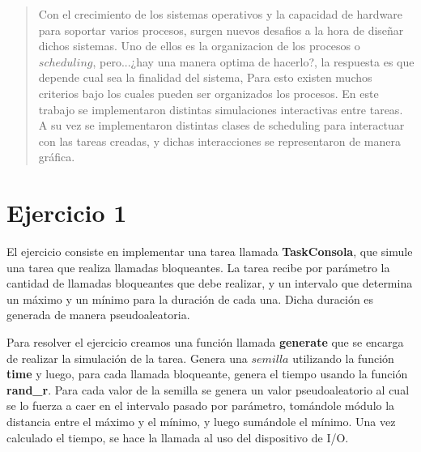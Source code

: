 \documentclass[11pt]{article}
\begin{document}
\subtitulo{}

\fecha{\today}

\grupo{}


\maketitle

\thispagestyle{empty}
\vspace{3cm}
\tableofcontents
\newpage
\vfill

\begin{abstract}
Con el crecimiento de los sistemas operativos y la capacidad de hardware para soportar varios procesos, surgen nuevos desafios a la hora de diseñar dichos sistemas. Uno de ellos es la organizacion de los procesos o $scheduling$, pero...¿hay una manera optima de hacerlo?, la respuesta es que depende cual sea la finalidad del sistema, Para esto existen muchos criterios bajo los cuales pueden ser organizados los procesos. 
 En este trabajo se implementaron distintas simulaciones interactivas entre tareas. A su vez se implementaron distintas clases de scheduling para interactuar 
 con las tareas creadas, y dichas interacciones se representaron de manera gráfica.
\end{abstract}

\newpage

\section{Ejercicio 1}

El ejercicio consiste en implementar una tarea llamada \textbf{TaskConsola}, que simule una tarea que realiza llamadas bloqueantes. La tarea 
recibe por parámetro la cantidad de llamadas bloqueantes que debe realizar, y un intervalo que determina un máximo y un mínimo para la duración 
de cada una. Dicha duración es generada de manera pseudoaleatoria.

Para resolver el ejercicio creamos una función llamada \textbf{generate} que se encarga de realizar la simulación de la tarea. Genera una $semilla$ utilizando la función 
\textbf{time} y luego, para cada llamada bloqueante, genera el tiempo usando la función \textbf{rand\_r}. Para cada valor de la semilla 
se genera un valor pseudoaleatorio al cual se lo fuerza a caer en el intervalo pasado por parámetro, tomándole módulo la distancia entre el máximo y 
el mínimo, y luego sumándole el mínimo. Una vez calculado el tiempo, se hace la llamada al uso del dispositivo de I/O.
\end{document}
